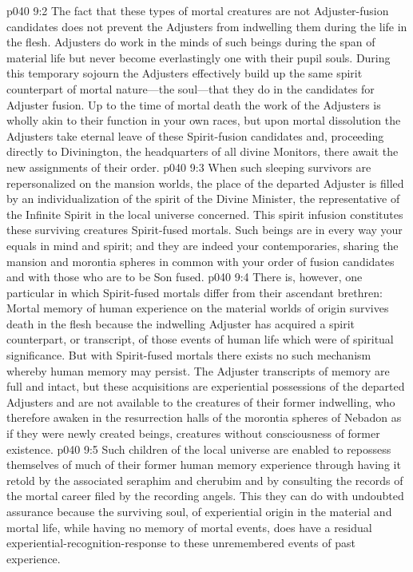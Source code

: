 \pc \vs p040 9:2 The fact that these types of mortal creatures are not Adjuster\hyp{}fusion candidates does not prevent the Adjusters from indwelling them during the life in the flesh. Adjusters do work in the minds of such beings during the span of material life but never become everlastingly one with their pupil souls. During this temporary sojourn the Adjusters effectively build up the same spirit counterpart of mortal nature---the soul---that they do in the candidates for Adjuster fusion. Up to the time of mortal death the work of the Adjusters is wholly akin to their function in your own races, but upon mortal dissolution the Adjusters take eternal leave of these Spirit\hyp{}fusion candidates and, proceeding directly to Divinington, the headquarters of all divine Monitors, there await the new assignments of their order.
\vs p040 9:3 When such sleeping survivors are repersonalized on the mansion worlds, the place of the departed Adjuster is filled by an individualization of the spirit of the Divine Minister, the representative of the Infinite Spirit in the local universe concerned. This spirit infusion constitutes these surviving creatures Spirit\hyp{}fused mortals. Such beings are in every way your equals in mind and spirit; and they are indeed your contemporaries, sharing the mansion and morontia spheres in common with your order of fusion candidates and with those who are to be Son fused.
\pc \vs p040 9:4 There is, however, one particular in which Spirit\hyp{}fused mortals differ from their ascendant brethren: Mortal memory of human experience on the material worlds of origin survives death in the flesh because the indwelling Adjuster has acquired a spirit counterpart, or transcript, of those events of human life which were of spiritual significance. But with Spirit\hyp{}fused mortals there exists no such mechanism whereby human memory may persist. The Adjuster transcripts of memory are full and intact, but these acquisitions are experiential possessions of the departed Adjusters and are not available to the creatures of their former indwelling, who therefore awaken in the resurrection halls of the morontia spheres of Nebadon as if they were newly created beings, creatures without consciousness of former existence.\plusone
\vs p040 9:5 Such children of the local universe are enabled to repossess themselves of much of their former human memory experience through having it retold by the associated seraphim and cherubim and by consulting the records of the mortal career filed by the recording angels. This they can do with undoubted assurance because the surviving soul, of experiential origin in the material and mortal life, while having no memory of mortal events, does have a residual experiential\hyp{}recognition\hyp{}response to these unremembered events of past experience.
